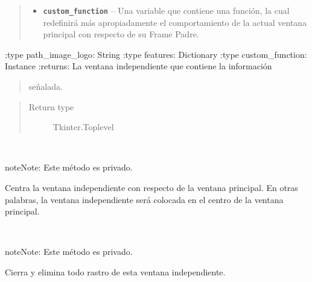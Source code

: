 \documentclass[letterpaper,10pt,english]{sphinxmanual}
\begin{document}
\begin{fulllineitems}
\begin{quote}
\begin{description}
\begin{itemize}
\item {} 
\textbf{\texttt{custom\_function}} -- Una variable que contiene una función, la cual
redefinirá más apropiadamente el comportamiento de
la actual ventana principal con respecto de su Frame Padre.

\end{itemize}

\end{description}\end{quote}

;type path\_image\_logo: String
:type features: Dictionary
:type custom\_function: Instance
:returns: La ventana independiente que contiene la información
\begin{quote}

señalada.
\end{quote}
\begin{quote}\begin{description}
\item[{Return type}] \leavevmode
Tkinter.Toplevel

\end{description}\end{quote}

\begin{fulllineitems}
\label{View/Additional/MenuInternalOption/InternalOptionToplevel:View.Additional.MenuInternalOption.InternalOptionToplevel.InternalOptionToplevel._InternalOptionToplevel__center}~
\begin{notice}{note}{Note:}
Este método es privado.
\end{notice}

Centra la ventana independiente con respecto de la ventana principal.
En otras palabras, la ventana independiente será colocada en el centro de la 
ventana principal.

\end{fulllineitems}


\begin{fulllineitems}
\label{View/Additional/MenuInternalOption/InternalOptionToplevel:View.Additional.MenuInternalOption.InternalOptionToplevel.InternalOptionToplevel.close}~
\begin{notice}{note}{Note:}
Este método es privado.
\end{notice}

Cierra y elimina todo rastro de esta ventana independiente.

\end{fulllineitems}


\end{fulllineitems}
\end{document}
